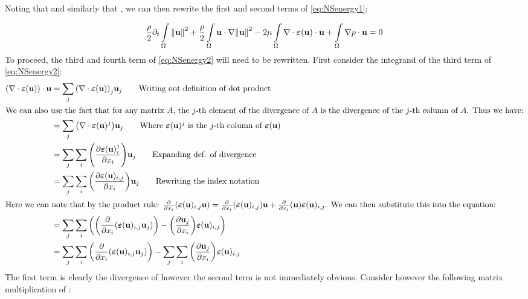  \noindent Noting that  and similarly that , we can then rewrite the first and second terms of \eqref{eq:NSenergy1}:
 
 \begin{equation}\label{eq:NSenergy2}
  \frac{\rho}{2}\partial_{t}\int\limits_{\Omega}\norm{{\textbf{u}}}^2 + \frac{\rho}{2}\int\limits_{\Omega}{\textbf{u}}\cdot\nabla\norm{{\textbf{u}}}^2 - 2\mu\int\limits_{\Omega}\nabla\cdot\bm{\varepsilon}({\textbf{u}}) \cdot {\textbf{u}} + \int\limits_{\Omega}\nabla p \cdot {\textbf{u}} = 0
 \end{equation}
 To proceed, the third and fourth term of \eqref{eq:NSenergy2} will need to be rewritten. First consider the integrand of the third term of \eqref{eq:NSenergy2}:
 \begin{align*}
     \qty(\nabla\cdot\stresstens)\cdot\bmu &= \sum_j \qty(\nabla\cdot\stresstens)_{j}\bmu_{j} \tag*{Writing out definition of dot product}\\
        \intertext{We can also use the fact that for any matrix \mathm{A}, the \mathm{j}-th element of the divergence of \mathm{A} is the divergence of the \mathm{j}-th column of \mathm{A}. Thus we have:}
        &= \sum_j \qty(\nabla\cdot\stresstens^{j})\bmu_{j} \tag*{Where \mathm{\stresstens^j} is the \mathm{j}-th column of \mathm{\stresstens}}\\
        &= \sum_j \sum_i \qty(\pdv{\stresstens^j_i}{x_i})\bmu_j \tag*{Expanding def. of divergence}\\
        &= \sum_j \sum_i \qty(\pdv{\stresstens_{i,j}}{x_i})\bmu_j \tag*{Rewriting the index notation}\\
        \intertext{Here we can note that by the product rule: \mathm{\pdv{}{x_i}\qty(\stresstens_{i,j}\bmu) = \pdv{}{x_i}\qty(\stresstens_{i,j})\bmu + \pdv{}{x_i}\qty(\bmu)\stresstens_{i,j}}. We can then substitute this into the equation:}
        &= \sum_j \sum_i \qty(\qty(\pdv{}{x_i}\qty(\stresstens_{i,j}\bmu_j)) - \qty(\pdv{\bmu_j}{x_i})\stresstens_{i,j})\\
        &= \sum_j \sum_i \qty(\pdv{}{x_i}\qty(\stresstens_{i,j}\bmu_j)) - \sum_j \sum_i \qty(\pdv{\bmu_j}{x_i})\stresstens_{i,j} \\
\end{align*}
The first term is clearly the divergence of \mathm{\stresstens\bmu} however the second term is not immediately obvious. Consider however the following matrix multiplication of \mathm{\stresstens\nabla\bmu}:\\
